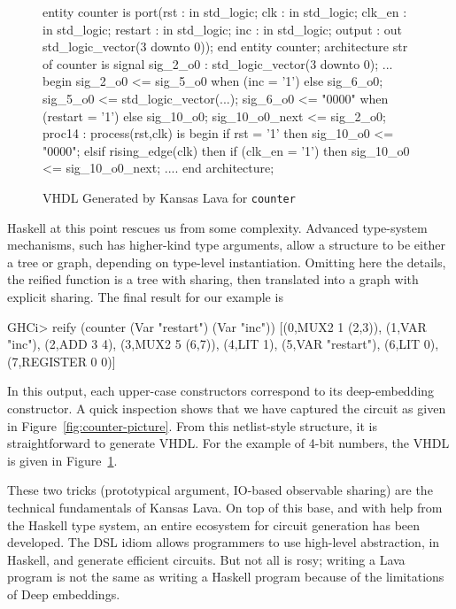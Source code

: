 \documentclass[11pt]{article}
\begin{document}
\begin{figure}[!t]
  \centering
   \begin{minipage}{0.6\textwidth}
     \centering
\footnotesize\begin{Code}[fontsize=\small]
entity counter is
  port(rst : in std_logic;
       clk : in std_logic;
       clk_en : in std_logic;
       restart : in std_logic;
       inc : in std_logic;
       output : out std_logic_vector(3 downto 0));
end entity counter;
architecture str of counter is
  signal sig_2_o0 : std_logic_vector(3 downto 0);
  ...
begin
  sig_2_o0 <= sig_5_o0 when (inc = '1')  else sig_6_o0;
  sig_5_o0 <= std_logic_vector(...);
  sig_6_o0 <= "0000" when (restart = '1') else sig_10_o0;
  sig_10_o0_next <= sig_2_o0;
  proc14 : process(rst,clk) is
  begin
    if rst = '1' then
      sig_10_o0 <= "0000";
    elsif rising_edge(clk) then
      if (clk_en = '1') then
        sig_10_o0 <= sig_10_o0_next;
  ....
end architecture;
\end{Code}
  \end{minipage}
  \caption{VHDL Generated by Kansas Lava for {\tt counter}}
  \label{fig:counter-VHDL}
\end{figure}

Haskell at this point rescues us from some complexity. Advanced type-system mechanisms, such has higher-kind type
arguments, allow a structure to be either a tree or graph, depending on type-level instantiation. 
Omitting here the details, the reified function is a tree with sharing,
then translated into a graph with explicit sharing. The final result for our example is
\begin{Code}
GHCi> reify (counter (Var "restart") (Var "inc"))
[(0,MUX2 1 (2,3)),
 (1,VAR "inc"),
 (2,ADD 3 4),
 (3,MUX2 5 (6,7)),
 (4,LIT 1),
 (5,VAR "restart"),
 (6,LIT 0),
 (7,REGISTER 0 0)]
\end{Code}
In this output, each upper-case constructors correspond to its deep-embedding constructor.
A quick inspection shows that we have captured the circuit as given in Figure~\ref{fig:counter-picture}.
From this netlist-style structure, it is straightforward to generate VHDL. For the example
of 4-bit numbers, the VHDL is given in Figure~\ref{fig:counter-VHDL}.

These two tricks (prototypical argument, IO-based observable sharing) are the technical fundamentals
of Kansas Lava. On top of this base, and with help from the Haskell type system, an entire ecosystem
for circuit generation has been developed. The DSL idiom allows programmers to use high-level 
abstraction, in Haskell, and generate efficient circuits. But not all is rosy; writing a Lava
program is not the same as writing a Haskell program because of the limitations of Deep
embeddings.
\end{document}
